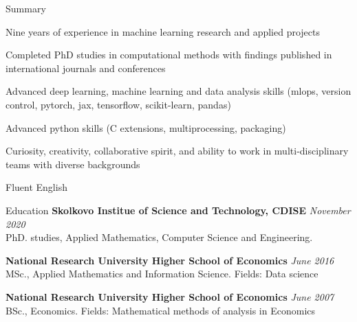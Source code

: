 \documentclass{resume} %
\begin{document}
\bigskip
\begin{rSection}{Summary}
    \item Nine years of experience in machine learning research and applied projects

    \item Completed PhD studies in computational methods with findings published
          in international journals and conferences

    \item Advanced deep learning, machine learning and data analysis skills
          (mlops, version control, pytorch, jax, tensorflow, scikit-learn, pandas)

    \item Advanced python skills (C extensions, multiprocessing, packaging)

    \item Curiosity, creativity, collaborative spirit, and ability to work in
          multi-disciplinary teams with diverse backgrounds

    \item Fluent English


\end{rSection}

\begin{rSection}{Education}
\textbf{Skolkovo Institue of Science and Technology, CDISE} \hfill \emph{November 2020} \\
PhD. studies, Applied Mathematics, Computer Science and Engineering.

\medskip
\textbf{National Research University Higher School of Economics} \hfill \emph{June 2016} \\
MSc., Applied Mathematics and Information Science. %
Fields: Data science

\medskip
\textbf{National Research University Higher School of Economics} \hfill \emph{June 2007} \\ 
BSc., Economics. %
Fields: Mathematical methods of analysis in Economics \\
\end{rSection}
\end{document}
